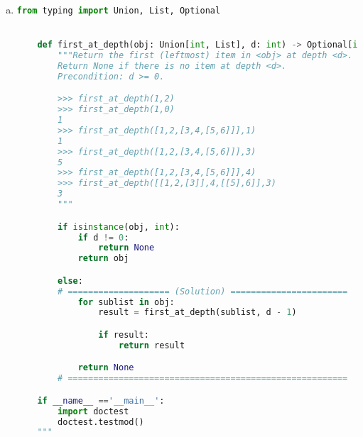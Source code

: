 \documentclass[12pt]{article}
\begin{document}
\begin{enumerate}[a.]
\begin{mdframed}
    \end{mdframed}

    \item

    \begin{lstlisting}[language=python,caption={worksheet\_16\_q2c\_solution.py}]
    from typing import Union, List, Optional


    def first_at_depth(obj: Union[int, List], d: int) -> Optional[int]:
        """Return the first (leftmost) item in <obj> at depth <d>.
        Return None if there is no item at depth <d>.
        Precondition: d >= 0.

        >>> first_at_depth(1,2)
        >>> first_at_depth(1,0)
        1
        >>> first_at_depth([1,2,[3,4,[5,6]]],1)
        1
        >>> first_at_depth([1,2,[3,4,[5,6]]],3)
        5
        >>> first_at_depth([1,2,[3,4,[5,6]]],4)
        >>> first_at_depth([[1,2,[3]],4,[[5],6]],3)
        3
        """

        if isinstance(obj, int):
            if d != 0:
                return None
            return obj

        else:
        # ==================== (Solution) =======================
            for sublist in obj:
                result = first_at_depth(sublist, d - 1)

                if result:
                    return result

            return None
        # =======================================================

    if __name__ =='__main__':
        import doctest
        doctest.testmod()
    """
    \end{lstlisting}


\end{enumerate}
\end{document}
